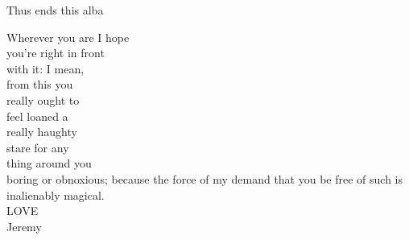 \secdiv

Thus ends this alba

Wherever you are I hope \\
you're right in front \\ 
with it: I mean, \\
from this you \\
really ought to \\
feel loaned a \\
really haughty \\
stare for any \\
thing around you \\
boring or obnoxious; because the force of my demand that you be free of such is inalienably magical. \\
LOVE \\
Jeremy